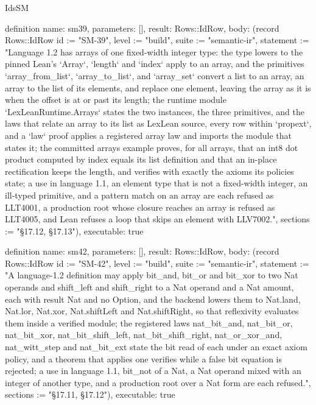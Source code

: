 \begin{lexlean}{IdsSM}
\begin{semanticmodule}
definition{
  name: sm39,
  parameters: [],
  result: Rows::IdRow,
  body: (record Rows::IdRow {id := "SM-39", level := "build", suite := "semantic-ir", statement := "Language 1.2 has arrays of one fixed-width integer type: the type lowers to the pinned Lean's `Array`, `length` and `index` apply to an array, and the primitives `array_from_list`, `array_to_list`, and `array_set` convert a list to an array, an array to the list of its elements, and replace one element, leaving the array as it is when the offset is at or past its length; the runtime module `LexLeanRuntime.Arrays` states the two instances, the three primitives, and the laws that relate an array to its list as LexLean source, every row within `propext`, and a `law` proof applies a registered array law and imports the module that states it; the committed arrays example proves, for all arrays, that an int8 dot product computed by index equals its list definition and that an in-place rectification keeps the length, and verifies with exactly the axioms its policies state; a use in language 1.1, an element type that is not a fixed-width integer, an ill-typed primitive, and a pattern match on an array are each refused as LLT4001, a production root whose closure reaches an array is refused as LLT4005, and Lean refuses a loop that skips an element with LLV7002.", sections := "§17.12, §17.13"}),
  executable: true
}

definition{
  name: sm42,
  parameters: [],
  result: Rows::IdRow,
  body: (record Rows::IdRow {id := "SM-42", level := "build", suite := "semantic-ir", statement := "A language-1.2 definition may apply bit_and, bit_or and bit_xor to two Nat operands and shift_left and shift_right to a Nat operand and a Nat amount, each with result Nat and no Option, and the backend lowers them to Nat.land, Nat.lor, Nat.xor, Nat.shiftLeft and Nat.shiftRight, so that reflexivity evaluates them inside a verified module; the registered laws nat_bit_and, nat_bit_or, nat_bit_xor, nat_bit_shift_left, nat_bit_shift_right, nat_or_xor_and, nat_witt_step and nat_bit_ext state the bit read of each under an exact axiom policy, and a theorem that applies one verifies while a false bit equation is rejected; a use in language 1.1, bit_not of a Nat, a Nat operand mixed with an integer of another type, and a production root over a Nat form are each refused.", sections := "§17.11, §17.12"}),
  executable: true
}


\end{semanticmodule}
\end{lexlean}
